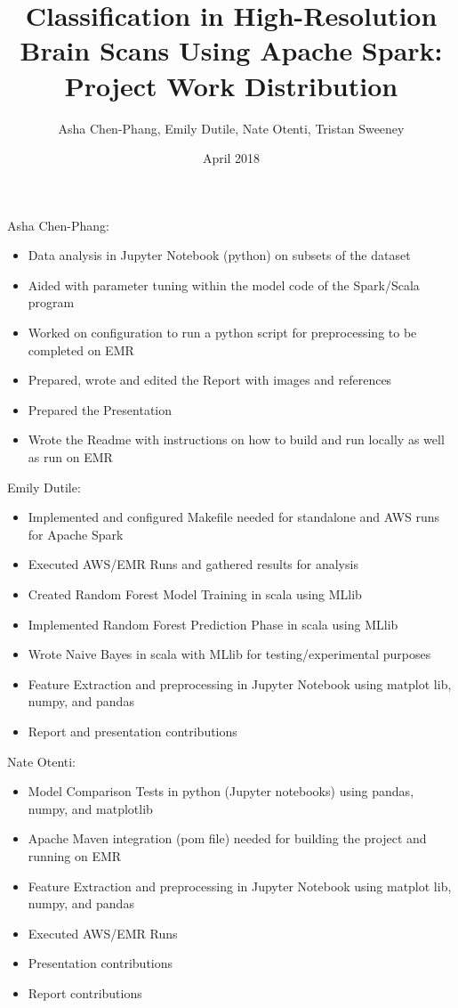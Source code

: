\documentclass{neu_handout}
\title{Classification in High-Resolution Brain Scans Using Apache Spark: Project Work Distribution}
\author{Asha Chen-Phang, Emily Dutile, Nate Otenti, Tristan Sweeney}
\date{April 2018}
\begin{document}
\newenvironment{myitemize}
{ \begin{itemize}
    \setlength{\itemsep}{0pt}
    \setlength{\parskip}{0pt}
    \setlength{\parsep}{0pt}     }
{ \end{itemize}                  } 

Asha Chen-Phang:
\begin{myitemize}
  \item Data analysis in Jupyter Notebook (python) on subsets of the dataset
   \item Aided with parameter tuning within the model code of the Spark/Scala program
   \item Worked on configuration to run a python script for preprocessing to be completed on EMR
  \item Prepared, wrote and edited the Report with images and references
  \item Prepared the Presentation
   \item Wrote the Readme with instructions on how to build and run locally as well as run on EMR
\end{myitemize}



Emily Dutile:
\begin{myitemize}
  \item Implemented and configured Makefile needed for standalone and AWS runs for Apache Spark
  \item Executed AWS/EMR Runs and gathered results for analysis
  \item Created Random Forest Model Training in scala using MLlib
  \item Implemented Random Forest Prediction Phase in scala using MLlib
  \item Wrote Naive Bayes in scala with MLlib for testing/experimental purposes
\item Feature Extraction and preprocessing in Jupyter Notebook using matplot lib, numpy, and pandas
  \item Report and presentation contributions
\end{myitemize}



Nate Otenti:
\begin{myitemize}
  \item Model Comparison Tests in python (Jupyter notebooks) using pandas, numpy, and matplotlib
   \item Apache Maven integration (pom file) needed for building the project and running on EMR
    \item Feature Extraction and preprocessing in Jupyter Notebook using matplot lib, numpy, and pandas
   \item Executed AWS/EMR Runs
   \item Presentation contributions
  \item Report contributions
\end{myitemize}
\end{document}
